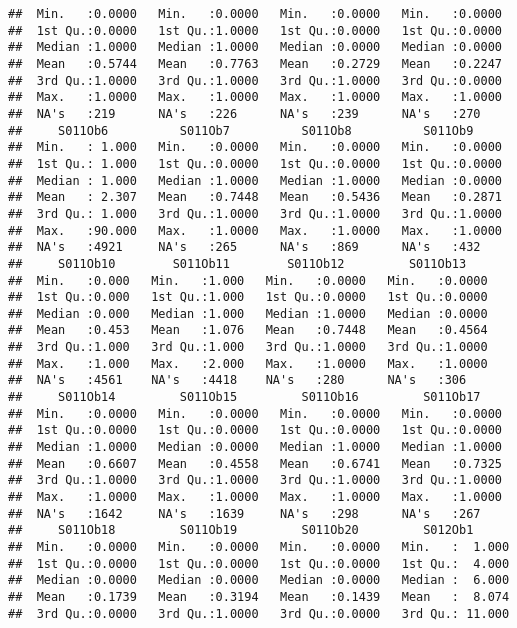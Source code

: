 \documentclass[
]{article}
\begin{document}
\begin{verbatim}
##  Min.   :0.0000   Min.   :0.0000   Min.   :0.0000   Min.   :0.0000  
##  1st Qu.:0.0000   1st Qu.:1.0000   1st Qu.:0.0000   1st Qu.:0.0000  
##  Median :1.0000   Median :1.0000   Median :0.0000   Median :0.0000  
##  Mean   :0.5744   Mean   :0.7763   Mean   :0.2729   Mean   :0.2247  
##  3rd Qu.:1.0000   3rd Qu.:1.0000   3rd Qu.:1.0000   3rd Qu.:0.0000  
##  Max.   :1.0000   Max.   :1.0000   Max.   :1.0000   Max.   :1.0000  
##  NA's   :219      NA's   :226      NA's   :239      NA's   :270     
##     S011Ob6          S011Ob7          S011Ob8          S011Ob9      
##  Min.   : 1.000   Min.   :0.0000   Min.   :0.0000   Min.   :0.0000  
##  1st Qu.: 1.000   1st Qu.:0.0000   1st Qu.:0.0000   1st Qu.:0.0000  
##  Median : 1.000   Median :1.0000   Median :1.0000   Median :0.0000  
##  Mean   : 2.307   Mean   :0.7448   Mean   :0.5436   Mean   :0.2871  
##  3rd Qu.: 1.000   3rd Qu.:1.0000   3rd Qu.:1.0000   3rd Qu.:1.0000  
##  Max.   :90.000   Max.   :1.0000   Max.   :1.0000   Max.   :1.0000  
##  NA's   :4921     NA's   :265      NA's   :869      NA's   :432     
##     S011Ob10        S011Ob11        S011Ob12         S011Ob13     
##  Min.   :0.000   Min.   :1.000   Min.   :0.0000   Min.   :0.0000  
##  1st Qu.:0.000   1st Qu.:1.000   1st Qu.:0.0000   1st Qu.:0.0000  
##  Median :0.000   Median :1.000   Median :1.0000   Median :0.0000  
##  Mean   :0.453   Mean   :1.076   Mean   :0.7448   Mean   :0.4564  
##  3rd Qu.:1.000   3rd Qu.:1.000   3rd Qu.:1.0000   3rd Qu.:1.0000  
##  Max.   :1.000   Max.   :2.000   Max.   :1.0000   Max.   :1.0000  
##  NA's   :4561    NA's   :4418    NA's   :280      NA's   :306     
##     S011Ob14         S011Ob15         S011Ob16         S011Ob17     
##  Min.   :0.0000   Min.   :0.0000   Min.   :0.0000   Min.   :0.0000  
##  1st Qu.:0.0000   1st Qu.:0.0000   1st Qu.:0.0000   1st Qu.:0.0000  
##  Median :1.0000   Median :0.0000   Median :1.0000   Median :1.0000  
##  Mean   :0.6607   Mean   :0.4558   Mean   :0.6741   Mean   :0.7325  
##  3rd Qu.:1.0000   3rd Qu.:1.0000   3rd Qu.:1.0000   3rd Qu.:1.0000  
##  Max.   :1.0000   Max.   :1.0000   Max.   :1.0000   Max.   :1.0000  
##  NA's   :1642     NA's   :1639     NA's   :298      NA's   :267     
##     S011Ob18         S011Ob19         S011Ob20         S012Ob1       
##  Min.   :0.0000   Min.   :0.0000   Min.   :0.0000   Min.   :  1.000  
##  1st Qu.:0.0000   1st Qu.:0.0000   1st Qu.:0.0000   1st Qu.:  4.000  
##  Median :0.0000   Median :0.0000   Median :0.0000   Median :  6.000  
##  Mean   :0.1739   Mean   :0.3194   Mean   :0.1439   Mean   :  8.074  
##  3rd Qu.:0.0000   3rd Qu.:1.0000   3rd Qu.:0.0000   3rd Qu.: 11.000  

\end{verbatim}
\end{document}
